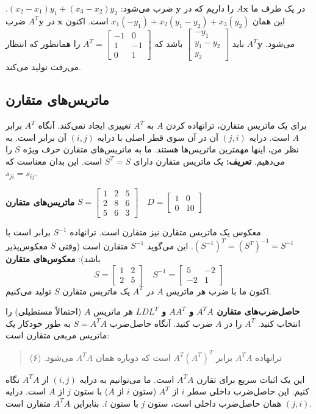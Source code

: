 \documentclass[12pt, a4paper]{book}
\begin{document}
	در یک طرف ما $A\mathbf{x}$ را داریم که در $\mathbf{y}$ ضرب می‌شود: $(x_2-x_1)y_1 + (x_3-x_2)y_2$.
	این همان $x_1(-y_1) + x_2(y_1-y_2) + x_3(y_2)$ است. اکنون $\mathbf{x}$ در $A^T\mathbf{y}$ ضرب می‌شود.
	$A^T\mathbf{y}$ باید $\begin{bmatrix} -y_1 \\ y_1-y_2 \\ y_2 \end{bmatrix}$ باشد که $A^T=\begin{bmatrix} -1 & 0 \\ 1 & -1 \\ 0 & 1 \end{bmatrix}$ را همانطور که انتظار می‌رفت تولید می‌کند.
	
	\subsection*{ماتریس‌های متقارن}
	برای یک ماتریس متقارن، ترانهاده کردن $A$ به $A^T$ تغییری ایجاد نمی‌کند. آنگاه $A^T$ برابر $A$ است. درایه $(j,i)$ آن در آن سوی قطر اصلی با درایه $(i,j)$ آن برابر است. به نظر من، اینها مهمترین ماتریس‌ها هستند. ما به ماتریس‌های متقارن حرف ویژه $S$ را می‌دهیم.
	\textbf{تعریف:} یک ماتریس متقارن دارای $S^T=S$ است. این بدان معناست که $s_{ji}=s_{ij}$.
	
	\textbf{ماتریس‌های متقارن} \quad $S = \begin{bmatrix} 1 & 2 & 5 \\ 2 & 8 & 6 \\ 5 & 6 & 3 \end{bmatrix} \quad D = \begin{bmatrix} 1 & 0 \\ 0 & 10 \end{bmatrix}$
	
	معکوس یک ماتریس متقارن نیز متقارن است. ترانهاده $S^{-1}$ برابر است با $(S^{-1})^T = (S^T)^{-1} = S^{-1}$. این می‌گوید $S^{-1}$ متقارن است (وقتی $S$ معکوس‌پذیر باشد):
	\textbf{معکوس‌های متقارن}
	\[ S = \begin{bmatrix} 1 & 2 \\ 2 & 5 \end{bmatrix} \quad S^{-1} = \begin{bmatrix} 5 & -2 \\ -2 & 1 \end{bmatrix} \]
	اکنون ما با ضرب هر ماتریس $A$ در $A^T$ یک ماتریس متقارن $S$ تولید می‌کنیم.
	
	\textbf{حاصل‌ضرب‌های متقارن $A^TA$ و $AA^T$ و $LDL^T$}
	هر ماتریس $A$ (احتمالاً مستطیلی) را انتخاب کنید. $A^T$ را در $A$ ضرب کنید. آنگاه حاصل‌ضرب $S=A^TA$ به طور خودکار یک ماتریس مربعی متقارن است:
	\begin{quote}
		ترانهاده $A^TA$ برابر $A^T(A^T)^T$ است که دوباره همان $A^TA$ می‌شود. \quad (۶)
	\end{quote}
	این یک اثبات سریع برای تقارن $A^TA$ است. ما می‌توانیم به درایه $(i,j)$ از $A^TA$ نگاه کنیم. این حاصل‌ضرب داخلی سطر $i$ از $A^T$ (ستون $i$ از $A$) با ستون $j$ از $A$ است. درایه $(j,i)$ همان حاصل‌ضرب داخلی است، ستون $j$ با ستون $i$. بنابراین $A^TA$ متقارن است.
	
\end{document}
